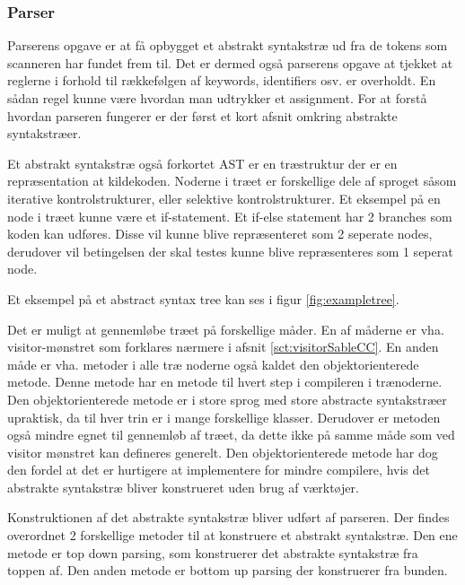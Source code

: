 \subsubsection{Parser}\wip
Parserens opgave er at få opbygget et abstrakt syntakstræ ud fra de tokens som scanneren har fundet frem til. Det er dermed også parserens opgave at tjekket at reglerne i forhold til rækkefølgen af keywords, identifiers osv. er overholdt. En sådan regel kunne være hvordan man udtrykker et assignment. For at forstå hvordan parseren fungerer er der først et kort afsnit omkring abstrakte syntakstræer.

Et abstrakt syntakstræ også forkortet AST er en træstruktur der er en repræsentation at kildekoden. Noderne i træet er forskellige dele af sproget såsom iterative kontrolstrukturer, eller selektive kontrolstrukturer. Et eksempel på en node i træet kunne være et if-statement. Et if-else statement har 2 branches som koden kan udføres. Disse vil kunne blive repræsenteret som 2 seperate nodes, derudover vil betingelsen der skal testes kunne blive repræsenteres som 1 seperat node.

\noindent Et eksempel på et abstract syntax tree kan ses i figur \ref{fig:exampletree}.


\noindent Det er muligt at gennemløbe træet på forskellige måder. En af måderne er vha. visitor-mønstret som forklares nærmere i afsnit \ref{sct:visitorSableCC}. En anden måde er vha. metoder i alle træ noderne også kaldet den objektorienterede metode. Denne metode har en metode til hvert step i compileren i trænoderne. Den objektorienterede metode er i store sprog med  store abstracte syntakstræer upraktisk, da til hver trin er i mange forskellige klasser. Derudover er metoden også mindre egnet til gennemløb af træet, da dette ikke på samme måde som ved visitor mønstret kan defineres generelt. Den objektorienterede metode har dog den fordel at det er hurtigere at implementere for mindre compilere, hvis det abstrakte syntakstræ bliver konstrueret uden brug af værktøjer.

Konstruktionen af det abstrakte syntakstræ bliver udført af parseren. Der findes overordnet 2 forskellige metoder til at konstruere et abstrakt syntakstræ. Den ene metode er top down parsing, som konstruerer det abstrakte syntakstræ fra toppen af. Den anden metode er bottom up parsing der konstruerer fra bunden.

